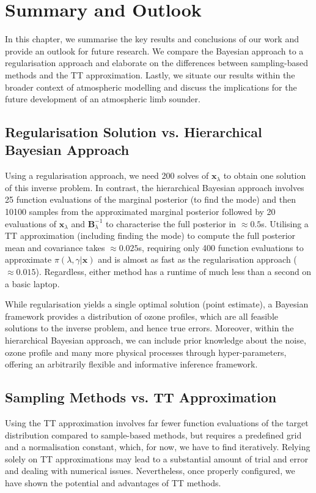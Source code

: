 \chapter{Summary and Outlook}
\label{ch:Concl}
In this chapter, we summarise the key results and conclusions of our work and provide an outlook for future research.
We compare the Bayesian approach to a regularisation approach and elaborate on the differences between sampling-based methods and the TT approximation.
Lastly, we situate our results within the broader context of atmospheric modelling and discuss the implications for the future development of an atmospheric limb sounder.



\section{Regularisation Solution vs. Hierarchical Bayesian Approach}
Using a regularisation approach, we need 200 solves of $\bm{x}_{\lambda}$ to obtain one solution of this inverse problem.
In contrast, the hierarchical Bayesian approach involves 25 function evaluations of the marginal posterior (to find the mode) and then 10100 samples from the approximated marginal posterior followed by 20 evaluations of $\bm{x}_{\lambda}$ and $\bm{B}^{-1}_{\lambda}$ to characterise the full posterior in $\approx 0.5$s.
Utilising a TT approximation (including finding the mode) to compute the full posterior mean and covariance takes $\approx 0.025$s, requiring only 400 function evaluations to approximate $\pi(\lambda, \gamma | \bm{x})$ and is almost as fast as the regularisation approach ($\approx 0.015$).
Regardless, either method has a runtime of much less than a second on a basic laptop.

While regularisation yields a single optimal solution (point estimate), a Bayesian framework provides a distribution of ozone profiles, which are all feasible solutions to the inverse problem, and hence true errors.
Moreover, within the hierarchical Bayesian approach, we can include prior knowledge about the noise, ozone profile and many more physical processes through hyper-parameters, offering an arbitrarily flexible and informative inference framework.


\section{Sampling Methods vs. TT Approximation}
Using the TT approximation involves far fewer function evaluations of the target distribution compared to sample-based methods, but requires a predefined grid and a normalisation constant, which, for now, we have to find iteratively.
Relying solely on TT approximations may lead to a substantial amount of trial and error and dealing with numerical issues.
Nevertheless, once properly configured, we have shown the potential and advantages of TT methods.


